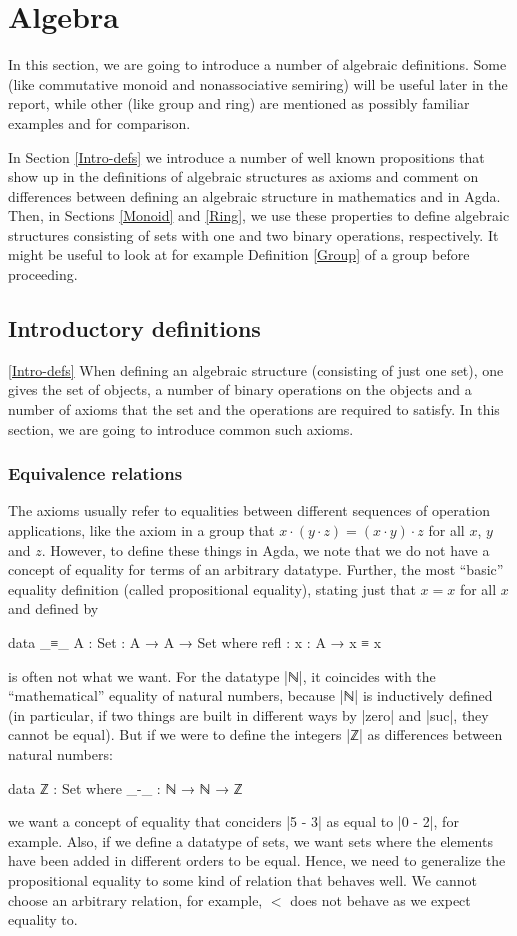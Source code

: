 \section{Algebra}
In this section, we are going to introduce a number of algebraic definitions. Some (like commutative monoid and nonassociative semiring) will be useful later in the report, while other (like group and ring) are mentioned as possibly familiar examples and for comparison.

In Section \ref{Intro-defs} we introduce a number of well known propositions that show up in the definitions of algebraic structures as axioms and comment on differences between defining an algebraic structure in mathematics and in Agda. Then, in Sections \ref{Monoid} and \ref{Ring}, we use these properties to define algebraic structures consisting of sets with one and two binary operations, respectively. It might be useful to look at for example Definition \ref{Group} of a group before proceeding.
\subsection{Introductory definitions}
\ref{Intro-defs}
When defining an algebraic structure (consisting of just one set), one gives the set of objects, a number of binary operations on the objects and a number of axioms that the set and the operations are required to satisfy. In this section, we are going to introduce common such axioms. 
\subsubsection{Equivalence relations}
\label{Algebra-equality}
The axioms usually refer to equalities between different sequences of operation applications, like the axiom in a group that $x \cdot (y \cdot z) = (x \cdot y) \cdot z$ for all $x$, $y$ and $z$. However, to define these things in Agda, we note that we do not have a concept of equality for terms of an arbitrary datatype. Further, the most ``basic'' equality definition (called propositional equality), stating just that $x = x$ for all $x$ and defined by
\begin{code}
data _≡_ {A : Set} : A → A → Set where
  refl : {x : A} → x ≡ x
\end{code}
is often not what we want. For the datatype |ℕ|, it coincides with the ``mathematical'' equality of natural numbers, because |ℕ| is inductively defined (in particular, if two things are built in different ways by |zero| and |suc|, they cannot be equal). But if we were to define the integers |ℤ| as differences between natural numbers:
\begin{code}
data ℤ : Set where
  _-_ : ℕ → ℕ → ℤ
\end{code}
we want a concept of equality that conciders |5 - 3| as equal to |0 - 2|, for example. Also, if we define a datatype of sets, we want sets where the elements have been added in different orders to be equal. Hence, we need to generalize the propositional equality to some kind of relation that behaves well. We cannot choose an arbitrary relation, for example, $<$ does not behave as we expect equality to. 

